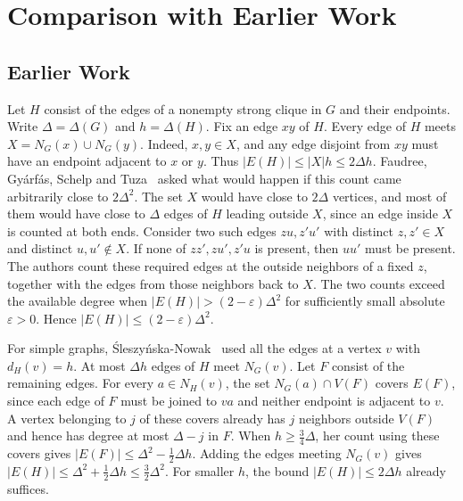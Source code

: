 \section{Comparison with Earlier Work}\label{sec:earlier-work}

\subsection{Earlier Work}

Let $H$ consist of the edges of a nonempty strong clique in $G$ and
their endpoints. Write $\Delta=\Delta(G)$ and $h=\Delta(H)$. Fix an
edge $xy$ of $H$. Every edge of $H$ meets $X=N_G(x)\cup N_G(y)$.
Indeed, $x,y\in X$, and any edge disjoint from $xy$ must have an
endpoint adjacent to $x$ or $y$. Thus $|E(H)|\leq |X|h\leq2\Delta h$.
Faudree, Gy\'arf\'as, Schelp and Tuza~\cite{FGST1990} asked what
would happen if this count came arbitrarily close to $2\Delta^2$.
The set $X$ would have close to $2\Delta$ vertices, and most of them
would have close to $\Delta$ edges of $H$ leading outside $X$, since
an edge inside $X$ is counted at both ends. Consider two such edges
$zu,z'u'$ with distinct $z,z'\in X$ and distinct $u,u'\notin X$.
If none of $zz',zu',z'u$ is present, then $uu'$ must be present.
The authors count these required edges at the outside neighbors of
a fixed $z$, together with the edges from those neighbors back to
$X$. The two counts exceed the available degree when
$|E(H)|>(2-\varepsilon)\Delta^2$ for sufficiently small absolute
$\varepsilon>0$. Hence $|E(H)|\leq(2-\varepsilon)\Delta^2$.

For simple graphs, \'{S}leszy\'{n}ska-Nowak~\cite{SleszynskaNowak2016}
used all the edges at a vertex $v$ with $d_H(v)=h$. At most $\Delta h$
edges of $H$ meet $N_G(v)$. Let $F$ consist of the remaining edges.
For every $a\in N_H(v)$, the set $N_G(a)\cap V(F)$ covers $E(F)$,
since each edge of $F$ must be joined to $va$ and neither endpoint is
adjacent to $v$. A vertex belonging to $j$ of these covers already
has $j$ neighbors outside $V(F)$ and hence has degree at most
$\Delta-j$ in $F$. When $h\geq\frac{3}{4}\Delta$, her count using
these covers gives $|E(F)|\leq\Delta^2-\frac{1}{2}\Delta h$.
Adding the edges meeting $N_G(v)$ gives
$|E(H)|\leq\Delta^2+\frac{1}{2}\Delta h\leq\frac{3}{2}\Delta^2$.
For smaller $h$, the bound $|E(H)|\leq2\Delta h$ already suffices.


